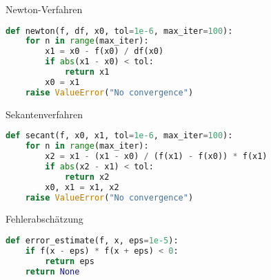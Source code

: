 \begin{examplecode}{Newton-Verfahren}
    \begin{lstlisting}[language=Python, style=basesmol]
def newton(f, df, x0, tol=1e-6, max_iter=100):
    for n in range(max_iter):
        x1 = x0 - f(x0) / df(x0)
        if abs(x1 - x0) < tol:
            return x1
        x0 = x1
    raise ValueError("No convergence")
    \end{lstlisting}
\end{examplecode}

\begin{examplecode}{Sekantenverfahren}
    \begin{lstlisting}[language=Python, style=basesmol]
def secant(f, x0, x1, tol=1e-6, max_iter=100):
    for n in range(max_iter):
        x2 = x1 - (x1 - x0) / (f(x1) - f(x0)) * f(x1)
        if abs(x2 - x1) < tol:
            return x2
        x0, x1 = x1, x2
    raise ValueError("No convergence")
    \end{lstlisting}
\end{examplecode}

\begin{examplecode}{Fehlerabschätzung}
    \begin{lstlisting}[language=Python, style=basesmol]
def error_estimate(f, x, eps=1e-5):
    if f(x - eps) * f(x + eps) < 0:
        return eps
    return None
    \end{lstlisting}
\end{examplecode}
